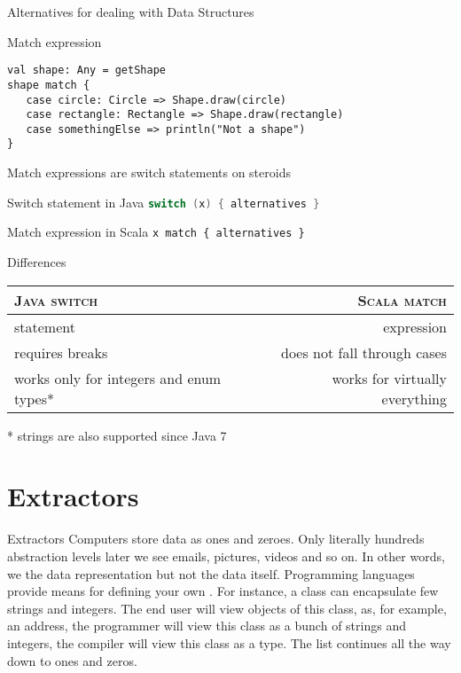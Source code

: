 \begin{frame}[fragile]{Alternatives for dealing with Data Structures}
\begin{block}{Match expression}
\begin{lstlisting}
val shape: Any = getShape
shape match {
   case circle: Circle => Shape.draw(circle)
   case rectangle: Rectangle => Shape.draw(rectangle)
   case somethingElse => println("Not a shape")
}
\end{lstlisting}
\end{block}
\end{frame}

\begin{frame}[fragile]{Match expressions are switch statements on steroids}
\begin{block}{Switch statement in Java}
\lstinline[language=java]!switch (x) { alternatives }!
\end{block}
\begin{block}{Match expression in Scala}
\lstinline!x match { alternatives }!
\end{block}
\begin{block}{Differences}
\begin{center}
\begin{tabular}{|l|r|}
\hline
\textsc{Java switch} & \textsc{Scala match}\\
\hline
\hline
statement & expression\\
\hline
requires breaks & does not fall through cases\\
\hline
works only for integers and enum types* & works for virtually everything\\
\hline
\end{tabular}
\end{center}
\end{block}
* strings are also supported since Java 7
\end{frame}
\section{Extractors}
\begin{frame}{Extractors}
Computers store data as ones and zeroes. Only literally hundreds abstraction
levels later we see emails, pictures, videos and so on. In other words,
we  the data representation but not the data itself. Programming
languages provide means for defining your own . For
instance, a class can encapsulate few strings and integers. The end user will
view objects of this class, as, for example, an address, the programmer will
view this class as a bunch of strings and integers, the compiler will view this
class as a type. The list continues all the way down to ones and zeros.
\end{frame}

